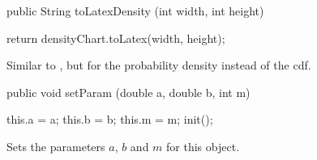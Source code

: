 \begin{htmlonly}
\end{htmlonly}
\begin{code}

   public String toLatexDensity (int width, int height) \begin{hide} {
      return densityChart.toLatex(width, height);
   }\end{hide}
\end{code}
\begin{tabb}
   Similar to , but for the probability density instead
   of the cdf.
\end{tabb}
\begin{htmlonly}
\end{htmlonly}
\begin{code}

   public void setParam (double a, double b, int m) \begin{hide} {
      this.a = a;
      this.b = b;
      this.m = m;
      init();
   }\end{hide}
\end{code}
\begin{tabb}
   Sets the parameters $a$, $b$ and $m$ for this object.
\end{tabb}
\begin{htmlonly}
\end{htmlonly}
\begin{code}
\begin{hide}
}\end{hide}
\end{code}
